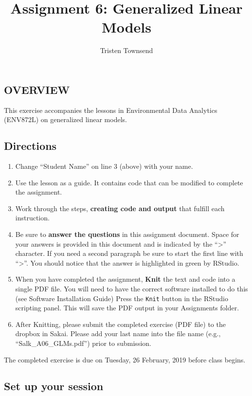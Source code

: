 \documentclass[]{article}
\title{Assignment 6: Generalized Linear Models}
\author{Tristen Townsend}
\date{}
\providecommand{\tightlist}{%
  \setlength{\itemsep}{0pt}\setlength{\parskip}{0pt}}
\begin{document}
\maketitle

\subsection{OVERVIEW}\label{overview}

This exercise accompanies the lessons in Environmental Data Analytics
(ENV872L) on generalized linear models.

\subsection{Directions}\label{directions}

\begin{enumerate}
\def\labelenumi{\arabic{enumi}.}
\tightlist
\item
  Change ``Student Name'' on line 3 (above) with your name.
\item
  Use the lesson as a guide. It contains code that can be modified to
  complete the assignment.
\item
  Work through the steps, \textbf{creating code and output} that fulfill
  each instruction.
\item
  Be sure to \textbf{answer the questions} in this assignment document.
  Space for your answers is provided in this document and is indicated
  by the ``\textgreater{}'' character. If you need a second paragraph be
  sure to start the first line with ``\textgreater{}''. You should
  notice that the answer is highlighted in green by RStudio.
\item
  When you have completed the assignment, \textbf{Knit} the text and
  code into a single PDF file. You will need to have the correct
  software installed to do this (see Software Installation Guide) Press
  the \texttt{Knit} button in the RStudio scripting panel. This will
  save the PDF output in your Assignments folder.
\item
  After Knitting, please submit the completed exercise (PDF file) to the
  dropbox in Sakai. Please add your last name into the file name (e.g.,
  ``Salk\_A06\_GLMs.pdf'') prior to submission.
\end{enumerate}

The completed exercise is due on Tuesday, 26 February, 2019 before class
begins.

\subsection{Set up your session}\label{set-up-your-session}
\end{document}
